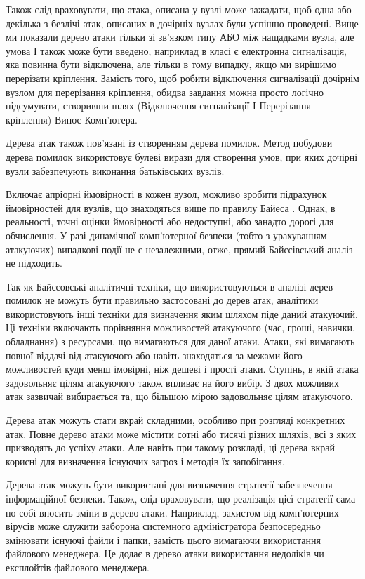 Також слід враховувати, що атака, описана у вузлі може зажадати, щоб одна або декілька з безлічі атак, описаних в дочірніх вузлах були успішно проведені. Вище ми показали дерево атаки тільки зі зв'язком типу АБО між нащадками вузла, але умова І також може бути введено, наприклад в класі є електронна сигналізація, яка повинна бути відключена, але тільки в тому випадку, якщо ми вирішимо перерізати кріплення. Замість того, щоб робити відключення сигналізації дочірнім вузлом для перерізання кріплення, обидва завдання можна просто логічно підсумувати, створивши шлях (Відключення сигналізації І Перерізання кріплення)-Винос Комп'ютера.

Дерева атак також пов'язані із створенням дерева помилок.  Метод побудови дерева помилок використовує булеві вирази для створення умов, при яких дочірні вузли забезпечують виконання батьківських вузлів.

Включає апріорні ймовірності в кожен вузол, можливо зробити підрахунок ймовірностей для вузлів, що знаходяться вище по правилу Байеса . Однак, в реальності, точні оцінки ймовірності або недоступні, або занадто дорогі для обчислення. У разі динамічної комп'ютерної безпеки (тобто з урахуванням атакуючих) випадкові події не є незалежними, отже, прямий Байєсівський аналіз не підходить.

Так як Байєсовські аналітичні техніки, що використовуються в аналізі дерев помилок не можуть бути правильно застосовані до дерев атак, аналітики використовують інші техніки для визначення яким шляхом піде даний атакуючий. Ці техніки включають порівняння можливостей атакуючого (час, гроші, навички, обладнання) з ресурсами, що вимагаються для даної атаки. Атаки, які вимагають повної віддачі від атакуючого або навіть знаходяться за межами його можливостей куди менш імовірні, ніж дешеві і прості атаки. Ступінь, в якій атака задовольняє цілям атакуючого також впливає на його вибір. З двох можливих атак зазвичай вибирається та, що більшою мірою задовольняє цілям атакуючого.

Дерева атак можуть стати вкрай складними, особливо при розгляді конкретних атак. Повне дерево атаки може містити сотні або тисячі різних шляхів, всі з яких призводять до успіху атаки. Але навіть при такому розкладі, ці дерева вкрай корисні для визначення існуючих загроз і методів їх запобігання.

Дерева атак можуть бути використані для визначення стратегії забезпечення інформаційної безпеки. Також, слід враховувати, що реалізація цієї стратегії сама по собі вносить зміни в дерево атаки. Наприклад, захистом від комп'ютерних вірусів може служити заборона системного адміністратора безпосередньо змінювати існуючі файли і папки, замість цього вимагаючи використання файлового менеджера. Це додає в дерево атаки використання недоліків чи експлойтів файлового менеджера.

